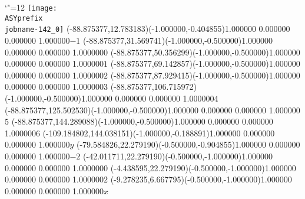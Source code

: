 \setlength{\unitlength}{1pt}%
\makeatletter%
\let\ASYencoding\f@encoding%
\let\ASYfamily\f@family%
\let\ASYseries\f@series%
\let\ASYshape\f@shape%
\makeatother%
{\catcode`"=12%
\texttt{[image: \\ASYprefix\\jobname-142\_0]}%
}%
\color{ASYcolor}%
\fontsize{12.000000}{14.400000}\selectfont%
\usefont{\ASYencoding}{\ASYfamily}{\ASYseries}{\ASYshape}%
\ASYalignT(-88.875377,12.783183)(-1.000000,-0.404855){1.000000 0.000000 0.000000 1.000000}{\vphantom{$10^4$}$-1$}%
\color{ASYcolor}%
\fontsize{12.000000}{14.400000}\selectfont%
\ASYalignT(-88.875377,31.569741)(-1.000000,-0.500000){1.000000 0.000000 0.000000 1.000000}{\vphantom{$10^4$}$0$}%
\color{ASYcolor}%
\fontsize{12.000000}{14.400000}\selectfont%
\ASYalignT(-88.875377,50.356299)(-1.000000,-0.500000){1.000000 0.000000 0.000000 1.000000}{\vphantom{$10^4$}$1$}%
\color{ASYcolor}%
\fontsize{12.000000}{14.400000}\selectfont%
\ASYalignT(-88.875377,69.142857)(-1.000000,-0.500000){1.000000 0.000000 0.000000 1.000000}{\vphantom{$10^4$}$2$}%
\color{ASYcolor}%
\fontsize{12.000000}{14.400000}\selectfont%
\ASYalignT(-88.875377,87.929415)(-1.000000,-0.500000){1.000000 0.000000 0.000000 1.000000}{\vphantom{$10^4$}$3$}%
\color{ASYcolor}%
\fontsize{12.000000}{14.400000}\selectfont%
\ASYalignT(-88.875377,106.715972)(-1.000000,-0.500000){1.000000 0.000000 0.000000 1.000000}{\vphantom{$10^4$}$4$}%
\color{ASYcolor}%
\fontsize{12.000000}{14.400000}\selectfont%
\ASYalignT(-88.875377,125.502530)(-1.000000,-0.500000){1.000000 0.000000 0.000000 1.000000}{\vphantom{$10^4$}$5$}%
\color{ASYcolor}%
\fontsize{12.000000}{14.400000}\selectfont%
\ASYalignT(-88.875377,144.289088)(-1.000000,-0.500000){1.000000 0.000000 0.000000 1.000000}{\vphantom{$10^4$}$6$}%
\color{ASYcolor}%
\fontsize{12.000000}{14.400000}\selectfont%
\ASYalignT(-109.184802,144.038151)(-1.000000,-0.188891){1.000000 0.000000 0.000000 1.000000}{$y$}%
\color{ASYcolor}%
\fontsize{12.000000}{14.400000}\selectfont%
\ASYalignT(-79.584826,22.279190)(-0.500000,-0.904855){1.000000 0.000000 0.000000 1.000000}{\vphantom{$10^4$}$-2$}%
\color{ASYcolor}%
\fontsize{12.000000}{14.400000}\selectfont%
\ASYalignT(-42.011711,22.279190)(-0.500000,-1.000000){1.000000 0.000000 0.000000 1.000000}{\vphantom{$10^4$}$0$}%
\color{ASYcolor}%
\fontsize{12.000000}{14.400000}\selectfont%
\ASYalignT(-4.438595,22.279190)(-0.500000,-1.000000){1.000000 0.000000 0.000000 1.000000}{\vphantom{$10^4$}$2$}%
\color{ASYcolor}%
\fontsize{12.000000}{14.400000}\selectfont%
\ASYalignT(-9.278235,6.667795)(-0.500000,-1.000000){1.000000 0.000000 0.000000 1.000000}{$x$}%

